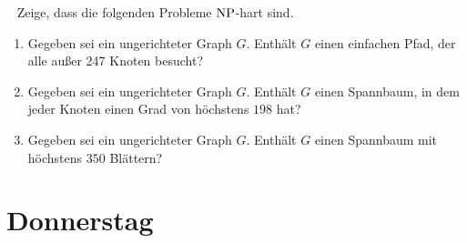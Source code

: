 \documentclass{uebung_cs}
\begin{document}
\begin{aufgabe}[$\NP$-Härte]\
	Zeige, dass die folgenden Probleme $\NP$-hart sind.
	\begin{enumerate}
		\item Gegeben sei ein ungerichteter Graph $G$. Enthält $G$ einen einfachen Pfad, der alle außer 247 Knoten besucht?
		\item Gegeben sei ein ungerichteter Graph $G$. Enthält $G$ einen Spannbaum, in dem jeder Knoten einen Grad von höchstens $198$ hat?
		\item Gegeben sei ein ungerichteter Graph $G$. Enthält $G$ einen Spannbaum mit höchstens $350$ Blättern?
	\end{enumerate}
\end{aufgabe}

\section*{Donnerstag}
\end{document}
